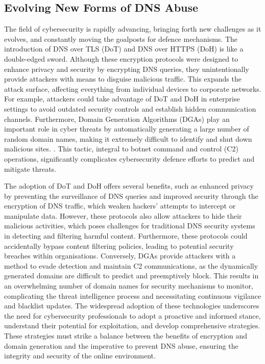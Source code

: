 \subsection{Evolving New Forms of DNS Abuse}

The field of cybersecurity is rapidly advancing, bringing forth new challenges as it evolves, and constantly moving the goalposts for defence mechanisms. The introduction of DNS over TLS (DoT) and DNS over HTTPS (DoH) is like a double-edged sword. Although these encryption protocols were designed to enhance privacy and security by encrypting DNS queries, they unintentionally provide attackers with means to disguise malicious traffic. This expands the attack surface, affecting everything from individual devices to corporate networks. For example, attackers could take advantage of DoT and DoH in enterprise settings to avoid outdated security controls and establish hidden communication channels. Furthermore, Domain Generation Algorithms (DGAs) play an important role in cyber threats by automatically generating a large number of random domain names, making it extremely difficult to identify and shut down malicious sites. \cite{kaur2023artificial}. This tactic, integral to botnet command and control (C2) operations, significantly complicates cybersecurity defence efforts to predict and mitigate threats.

The adoption of DoT and DoH offers several benefits, such as enhanced privacy by preventing the surveillance of DNS queries and improved security through the encryption of DNS traffic, which weaken hackers' attempts to intercept or manipulate data. However, these protocols also allow attackers to hide their malicious activities, which poses challenges for traditional DNS security systems in detecting and filtering harmful content. Furthermore, these protocols could accidentally bypass content filtering policies, leading to potential security breaches within organisations.
Conversely, DGAs provide attackers with a method to evade detection and maintain C2 communications, as the dynamically generated domains are difficult to predict and preemptively block. This results in an overwhelming number of domain names for security mechanisms to monitor, complicating the threat intelligence process and necessitating continuous vigilance and blacklist updates. The widespread adoption of these technologies underscores the need for cybersecurity professionals to adopt a proactive and informed stance, understand their potential for exploitation, and develop comprehensive strategies. These strategies must strike a balance between the benefits of encryption and domain generation and the imperative to prevent DNS abuse, ensuring the integrity and security of the online environment.


